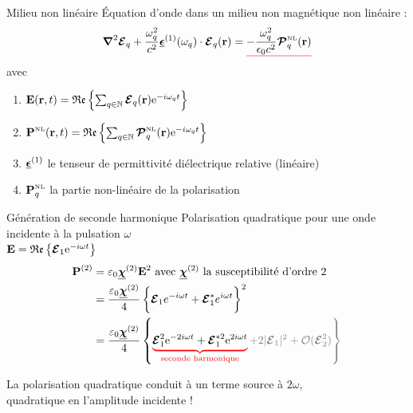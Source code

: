 \documentclass{beamer}
\begin{document}
\begin{frame}{Milieu non linéaire}
Équation d'onde dans un milieu non magnétique non linéaire :
\begin{equation*}
\boldsymbol{\nabla}^2 \boldsymbol{\E}_q + \frac{\omega_q^2}{c^2}\tens\epsilon^{(1)}(\omega_q)\cdot \v \E_q(\v r) = \uline{red}{ - \frac{\omega_q^2}{\epsilon_0 c^2} \boldsymbol{\mathcal{P}}^\mathsc{NL}_q(\v r) }
\end{equation*}
avec
\begin{enumerate}
\item[ ] $\v E(\v r, t) = \mathfrak{Re} \left\{ \sum_{q \in \mathbb N} \v {\boldsymbol{\mathcal E}}_q (\v r) \e{-i \omega_q t} \right\}$
\item[ ] $\v P^\mathsc{NL} (\v r, t) = \mathfrak{Re} \left\{ \sum_{q \in \mathbb N} \v {\boldsymbol{\mathcal P}}^\mathsc{NL}_q (\v r) \e{-i \omega_q t} \right\}$
\item[ ] $\tens \epsilon^{(1)}$ le tenseur de permittivité diélectrique relative (linéaire)
\item[ ] $\v P^\mathsc{NL}_q$ la partie non-linéaire de la polarisation
\end{enumerate}
\end{frame}

\begin{frame}{Génération de seconde harmonique}
Polarisation quadratique pour une onde incidente à la pulsation $\omega$ \\
$\v E = \mathfrak{Re} \left\{ \v \E_1 \e{-i\omega t} \right\}$
\begin{align*}
\v P^{(2)} &= \varepsilon_0 \tens\chi^{(2)} \v E^2 \text{ avec $\tens\chi^{(2)}$ la susceptibilité d'ordre 2}\\
&= \frac{\varepsilon_0 \tens\chi^{(2)}}{4} \left\{\v\E_1 e^{-i\omega t} + \v\E_1^* e^{i\omega t} \vphantom{\frac12}\right\}^2 \\
&= \frac{\varepsilon_0 \tens\chi^{(2)}}{4} \left\{\ubrace{red}{\v\E_1^2 \e{-2i\omega t} + \v\E_1^{*2} \e{2i\omega t}}{seconde harmonique}
\color{gray} + 2|\v \E_1|^2 + \mathcal O(\v\E_2^2) \vphantom{\frac12} \right\} 
\end{align*}
\begin{beamerboxesrounded}[width=\textwidth]{}
La polarisation quadratique conduit à un terme source à $2\omega$,\\quadratique en l'amplitude incidente !
\end{beamerboxesrounded}
\end{frame}
\end{document}
